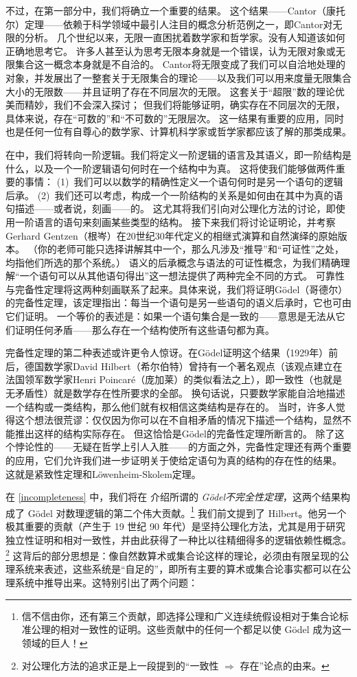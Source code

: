 不过，在第一部分中，我们将确立一个重要的结果。
这个结果——Cantor（康托尔）定理——依赖于科学领域中最引人注目的概念分析范例之一，即Cantor对无限的分析。
几个世纪以来，无限一直困扰着数学家和哲学家。没有人知道该如何正确地思考它。
许多人甚至认为思考无限本身就是一个错误，认为无限对象或无限集合这一概念本身就是不自洽的。
Cantor将无限变成了我们可以自洽地处理的对象，并发展出了一整套关于无限集合的理论——以及我们可以用来度量无限集合大小的无限数——并且证明了存在不同层次的无限。
这套关于“超限”数的理论优美而精妙，我们不会深入探讨；
但我们将能够证明，确实存在不同层次的无限，具体来说，存在“可数的”和“不可数的”无限层次。
这一结果有重要的应用，同时也是任何一位有自尊心的数学家、计算机科学家或哲学家都应该了解的那类成果。

在中，我们将转向一阶逻辑。我们将定义一阶逻辑的语言及其语义，即一阶结构是什么，以及一个一阶逻辑语句何时在一个结构中为真。
这将使我们能够做两件重要的事情： (1)~我们可以以数学的精确性定义一个语句何时是另一个语句的逻辑后承。 (2)~我们还可以考虑，构成一个一阶结构的关系是如何由在其中为真的语句描述——或者说，刻画——的。
这尤其将我们引向对公理化方法的讨论，即使用一阶语言的语句来刻画某些类型的结构。
接下来我们将讨论证明论，并考察Gerhard Gentzen（根岑）在20世纪30年代定义的相继式演算和自然演绎的原始版本。
（你的老师可能只选择讲解其中一个，那么凡涉及“推导”和“可证性”之处，均指他们所选的那个系统。）
语义的后承概念与语法的可证性概念，为我们精确理解“一个语句可以从其他语句得出”这一想法提供了两种完全不同的方式。
可靠性与完备性定理将这两种刻画联系了起来。具体来说，我们将证明Gödel（哥德尔）的完备性定理，该定理指出：每当一个语句是另一些语句的语义后承时，它也可由它们证明。
一个等价的表述是：如果一个语句集合是一致的——意思是无法从它们证明任何矛盾——那么存在一个结构使所有这些语句都为真。

完备性定理的第二种表述或许更令人惊讶。在Gödel证明这个结果（1929年）前后，德国数学家David Hilbert（希尔伯特）曾持有一个著名观点（该观点建立在法国领军数学家Henri Poincaré（庞加莱）的类似看法之上），即一致性（也就是无矛盾性）就是数学存在性所要求的全部。
换句话说，只要数学家能自洽地描述一个结构或一类结构，那么他们就有权相信这类结构是存在的。
当时，许多人觉得这个想法很荒谬：仅仅因为你可以在不自相矛盾的情况下描述一个结构，显然不能推出这样的结构实际存在。
但这恰恰是Gödel的完备性定理所断言的。
除了这个悖论性的——无疑在哲学上引人入胜——的方面之外，完备性定理还有两个重要的应用，它们允许我们进一步证明关于使给定语句为真的结构的存在性的结果。
这就是紧致性定理和Löwenheim-Skolem定理。

在 \cref{incompleteness} 中，我们将在
 介绍所谓的
\emph{Gödel不完全性定理}，这两个结果构成了
Gödel 对数理逻辑的第二个伟大贡献。\footnote{信不信由你，还有第三个贡献，即选择公理和广义连续统假设相对于集合论标准公理的相对一致性的证明。这些贡献中的任何一个都足以使 Gödel 成为这一领域的巨人！} 我们前文提到了 Hilbert。他另一个极其重要的贡献（产生于 19 世纪 90 年代）是坚持公理化方法，尤其是用于研究独立性证明和相对一致性，并由此获得了一种比以往精细得多的逻辑依赖性概念。\footnote{对公理化方法的追求正是上一段提到的“一致性 $\Rightarrow$ 存在”论点的由来。} 这背后的部分思想是：像自然数算术或集合论这样的理论，必须由有限呈现的公理系统来表述，这些系统是“自足的”，即所有主要的算术或集合论事实都可以在公理系统中推导出来。这特别引出了两个问题：

